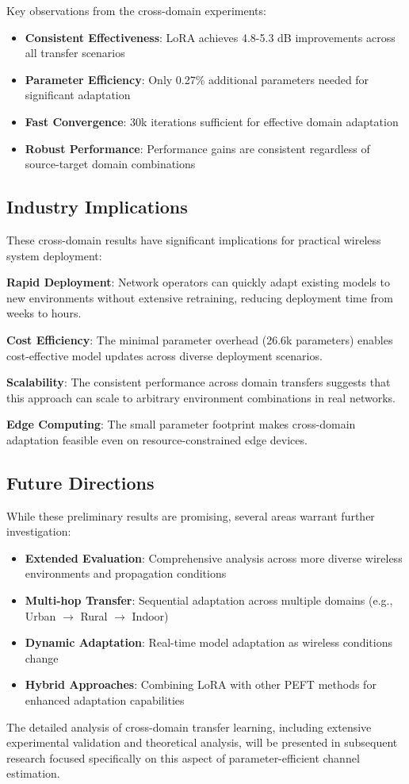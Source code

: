 

Key observations from the cross-domain experiments:

\begin{itemize}
\item \textbf{Consistent Effectiveness}: LoRA achieves 4.8-5.3 dB improvements across all transfer scenarios
\item \textbf{Parameter Efficiency}: Only 0.27\% additional parameters needed for significant adaptation
\item \textbf{Fast Convergence}: 30k iterations sufficient for effective domain adaptation
\item \textbf{Robust Performance}: Performance gains are consistent regardless of source-target domain combinations
\end{itemize}

\subsection{Industry Implications}

These cross-domain results have significant implications for practical wireless system deployment:

\textbf{Rapid Deployment}: Network operators can quickly adapt existing models to new environments without extensive retraining, reducing deployment time from weeks to hours.

\textbf{Cost Efficiency}: The minimal parameter overhead (26.6k parameters) enables cost-effective model updates across diverse deployment scenarios.

\textbf{Scalability}: The consistent performance across domain transfers suggests that this approach can scale to arbitrary environment combinations in real networks.

\textbf{Edge Computing}: The small parameter footprint makes cross-domain adaptation feasible even on resource-constrained edge devices.

\subsection{Future Directions}

While these preliminary results are promising, several areas warrant further investigation:

\begin{itemize}
\item \textbf{Extended Evaluation}: Comprehensive analysis across more diverse wireless environments and propagation conditions
\item \textbf{Multi-hop Transfer}: Sequential adaptation across multiple domains (e.g., Urban $\rightarrow$ Rural $\rightarrow$ Indoor)
\item \textbf{Dynamic Adaptation}: Real-time model adaptation as wireless conditions change
\item \textbf{Hybrid Approaches}: Combining LoRA with other PEFT methods for enhanced adaptation capabilities
\end{itemize}

The detailed analysis of cross-domain transfer learning, including extensive experimental validation and theoretical analysis, will be presented in subsequent research focused specifically on this aspect of parameter-efficient channel estimation.